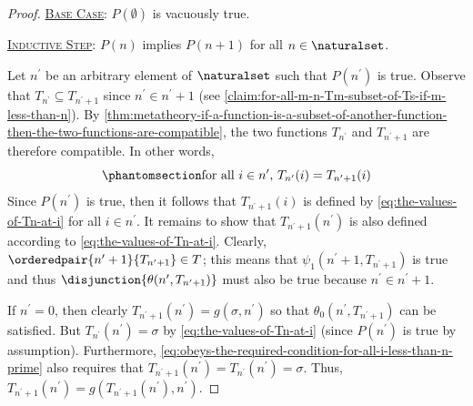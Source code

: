 \begin{proof}
    \vspace{0.3cm}
    \noindent
    \underline{\scshape Base Case}: \( P(\emptyset) \) is vacuously true.

    \vspace{0.3cm}
    \noindent
    \underline{\scshape Inductive Step}: \( P(n) \) implies \( P(n + 1) \) for all \( n \in \naturalset \).

    \vspace{0.3cm}
    \noindent
    Let \( n^{\prime} \) be an arbitrary element of \( \naturalset \) such that \( P(n^{\prime}) \) is true.
    Observe that \( T_{n^{\prime}} \subseteq T_{n^{\prime} + 1} \) since \( n^{\prime} \in n^{\prime} + 1 \) (see \cref{claim:for-all-m-n-Tm-subset-of-Ts-if-m-less-than-n}).
    By \cref{thm:metatheory-if-a-function-is-a-subset-of-another-function-then-the-two-functions-are-compatible}, the two functions \( T_{n^{\prime}} \)
    and \( T_{n^{\prime} + 1} \) are therefore compatible.
    In other words,
    \begin{equation}
        \phantomsection \label{eq:obeys-the-required-condition-for-all-i-less-than-n-prime}
        \text{for all \( i \in n^{\prime} \), \( T_{n^{\prime}}(i) = T_{n^{\prime} + 1}(i) \)}
    \end{equation}
    Since \( P(n^{\prime}) \) is true, then it follows that \( T_{n^{\prime} + 1}(i) \) is defined by \eqref{eq:the-values-of-Tn-at-i} for all \( i \in n^{\prime} \).
    It remains to show that \( T_{n^{\prime} + 1}(n^{\prime}) \) is also defined according to \eqref{eq:the-values-of-Tn-at-i}.
    Clearly, \( \orderedpair{n^{\prime} + 1}{T_{n^{\prime} + 1}} \in T \); this means that
    \( \psi_{1}(n^{\prime} + 1, T_{n^{\prime} + 1}) \) is true and thus
    \( \disjunction{\theta(n^{\prime}, T_{n^{\prime} + 1})} \) must also be true because \( n^{\prime} \in n^{\prime} + 1 \).

    \vspace{0.3cm}
    \noindent
    If \( n^{\prime} = 0 \), then clearly \( T_{n^{\prime} + 1}(n^{\prime}) = g(\sigma, n^{\prime})\) so that \( \theta_{0}(n^{\prime}, T_{n^{\prime} + 1}) \) can
    be satisfied.
    But \( T_{n^{\prime}}(n^{\prime}) = \sigma \) by \eqref{eq:the-values-of-Tn-at-i} (since \( P(n^{\prime}) \) is true by assumption).
    Furthermore, \eqref{eq:obeys-the-required-condition-for-all-i-less-than-n-prime} also requires that \( T_{n^{\prime} + 1}(n^{\prime}) = T_{n^{\prime}}(n^{\prime}) = \sigma \).
    Thus, \( T_{n^{\prime} + 1}(n^{\prime}) = g(T_{n^{\prime} + 1}(n^{\prime}), n^{\prime}) \).


\end{proof}
